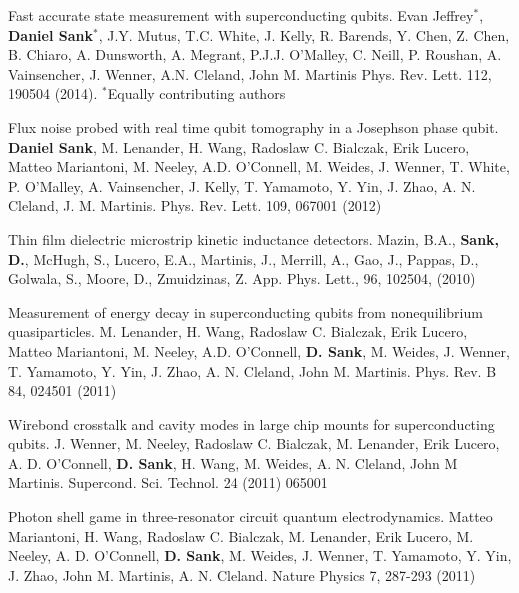 \documentclass[margin=2cm,line]{res}
\begin{document}
\begin{resume}
\begin{list3}

\item Fast accurate state measurement with superconducting qubits. Evan Jeffrey$^*$, \textbf{Daniel Sank}$^*$, J.Y. Mutus, T.C. White, J. Kelly, R. Barends, Y. Chen, Z. Chen, B. Chiaro, A. Dunsworth, A. Megrant, P.J.J. O'Malley, C. Neill, P. Roushan, A. Vainsencher, J. Wenner, A.N. Cleland, John M. Martinis Phys. Rev. Lett. 112, 190504 (2014). $^*$Equally contributing authors\\

\item Flux noise probed with real time qubit tomography in a Josephson phase qubit. \textbf{Daniel Sank}, M. Lenander, H. Wang, Radoslaw C. Bialczak, Erik Lucero, Matteo Mariantoni, M. Neeley, A.D. O'Connell, M. Weides, J. Wenner, T. White, P. O'Malley, A. Vainsencher, J. Kelly, T. Yamamoto, Y. Yin, J. Zhao, A. N. Cleland, J. M. Martinis. Phys. Rev. Lett. 109, 067001 (2012) \\

\item Thin film dielectric microstrip kinetic inductance detectors. Mazin, B.A., \textbf{Sank, D.}, McHugh, S., Lucero, E.A., Martinis, J., Merrill, A., Gao, J., Pappas, D., Golwala, S., Moore, D., Zmuidzinas, Z. App. Phys. Lett., 96, 102504, (2010) \\

\item Measurement of energy decay in superconducting qubits from nonequilibrium quasiparticles. M. Lenander, H. Wang, Radoslaw C. Bialczak, Erik Lucero, Matteo Mariantoni, M. Neeley, A.D. O'Connell, \textbf{D. Sank}, M. Weides, J. Wenner, T. Yamamoto, Y. Yin, J. Zhao, A. N. Cleland, John M. Martinis. Phys. Rev. B 84, 024501 (2011)

\item Wirebond crosstalk and cavity modes in large chip mounts for superconducting qubits. J. Wenner, M. Neeley, Radoslaw C. Bialczak, M. Lenander, Erik Lucero, A. D. O'Connell, \textbf{D. Sank}, H. Wang, M. Weides, A. N. Cleland, John M Martinis. Supercond. Sci. Technol. 24 (2011) 065001 \\

\item Photon shell game in three-resonator circuit quantum electrodynamics. Matteo Mariantoni, H. Wang, Radoslaw C. Bialczak, M. Lenander, Erik Lucero, M. Neeley, A. D. O'Connell, \textbf{D. Sank}, M. Weides, J. Wenner, T. Yamamoto, Y. Yin, J. Zhao, John M. Martinis, A. N. Cleland. Nature Physics 7, 287-293 (2011) \\


\end{list3}
\end{resume}
\end{document}
